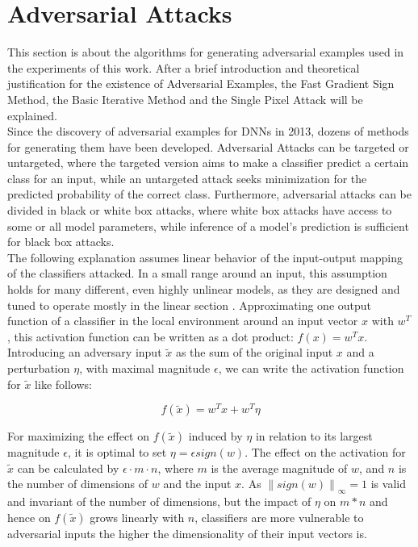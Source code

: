 \documentclass[draft,final]{vutinfth} %
\newcommand{\norm}[1]{\left\lVert#1\right\rVert}
\begin{document}
\section{Adversarial Attacks}
\label{section:adv_att}

This section is about the algorithms for generating adversarial examples used in the experiments of this work.
After a brief introduction and theoretical justification for the existence of Adversarial Examples, the Fast Gradient Sign Method, the Basic Iterative Method and the Single Pixel Attack will be explained.\\
Since the discovery of adversarial examples for DNNs in 2013, dozens of methods for generating them have been developed.
Adversarial Attacks can be targeted or untargeted, where the targeted version aims to make a classifier predict a certain class for an input, while an untargeted attack seeks minimization for the predicted probability of the correct class.
Furthermore, adversarial attacks can be divided in black or white box attacks, where white box attacks have access to some or all model parameters, while inference of a model's prediction is sufficient for black box attacks.
\\
The following explanation assumes linear behavior of the input-output mapping of the classifiers attacked.
In a small range around an input, this assumption holds for many different, even highly unlinear models, as they are designed and tuned to operate mostly in the linear section \cite{Goodfellow2015}.
Approximating one output function of a classifier in the local environment around an input vector $x$ with $w^T$, this activation function can be written as a dot product: $f(x) = w^Tx$.
Introducing an adversary input $\tilde{x}$ as the sum of the original input $x$ and a perturbation $\eta$, with maximal magnitude $\epsilon$, we can write the activation function for $\tilde{x}$ like follows:

\begin{equation}
	f(\tilde{x}) = w^Tx + w^T\eta
\end{equation}

For maximizing the effect on $f(\tilde{x})$ induced by $\eta$ in relation to its largest magnitude $\epsilon$, it is optimal to set $\eta = \epsilon sign(w)$.
The effect on the activation for $\tilde{x}$ can be calculated by $\epsilon \cdot m \cdot n$, where $m$ is the average magnitude of $w$, and $n$ is the number of dimensions of $w$ and the input $x$.
As $\norm{sign(w)}_\infty = 1$ is valid and invariant of the number of dimensions, but the impact of $\eta$ on $m*n$ and hence on $f(\tilde{x})$ grows linearly with $n$, classifiers are more vulnerable to adversarial inputs the higher the dimensionality of their input vectors is. \cite{Goodfellow2015}
\end{document}
